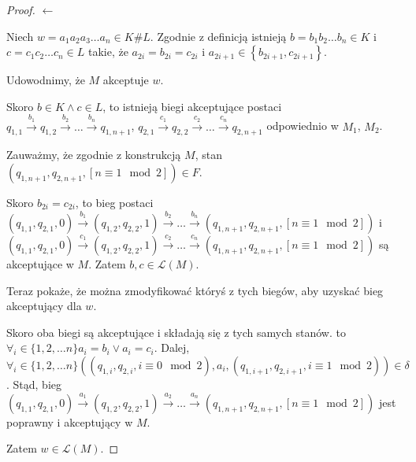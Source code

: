 \documentclass{article}
\theoremstyle{definition}
\theoremstyle{remark}
\begin{document}
\begin{proof}
    \(\leftarrow\)

    Niech \(w = a_1 a_2 a_3\ldots a_n \in K \# L\). Zgodnie z definicją istnieją \(b=b_1 b_2 \ldots b_n \in K\) i \(c=c_1 c_2 \ldots c_n \in L\) takie,
    że \(a_{2i} = b_{2i} = c_{2i}\) i \(a_{2i+1} \in \left\{ b_{2i+1}, c_{2i+1} \right\}\).

    Udowodnimy, że \(M\) akceptuje \(w\).

    Skoro \(b \in K \land c \in L\), to istnieją biegi akceptujące postaci \(q_{1,1} \xrightarrow{b_1} q_{1,2} \xrightarrow{b_2} \ldots \xrightarrow{b_n} q_{1,n+1}\),
    \(q_{2,1} \xrightarrow{c_1} q_{2,2} \xrightarrow{c_2} \ldots \xrightarrow{c_n} q_{2,n+1}\) odpowiednio w \(M_1\), \(M_2\).

    Zauważmy, że zgodnie z konstrukcją \(M\), stan \( \left( q_{1,n+1}, q_{2,n+1}, \left[ n \equiv 1 \mod 2 \right] \right) \in F\).
    
    Skoro \(b_{2i} = c_{2i}\), to bieg postaci
    \( \left(q_{1,1}, q_{2,1}, 0 \right) \xrightarrow{b_1} \left(q_{1,2}, q_{2,2}, 1 \right) \xrightarrow{b_2} \ldots \xrightarrow{b_n} \left(q_{1,n+1}, q_{2,n+1}, \left[ n \equiv 1 \mod 2  \right] \right) \)
    i
    \( \left(q_{1,1}, q_{2,1}, 0 \right) \xrightarrow{c_1} \left(q_{1,2}, q_{2,2}, 1 \right) \xrightarrow{c_2} \ldots \xrightarrow{c_n} \left(q_{1,n+1}, q_{2,n+1}, \left[ n \equiv 1 \mod 2  \right] \right) \)
    są akceptujące w \(M\). Zatem \(b, c \in \mathcal{L}(M)\).
    
    Teraz pokaże, że można zmodyfikować któryś z tych biegów, aby uzyskać bieg akceptujący dla \(w\).

    Skoro oba biegi są akceptujące i składają się z tych samych stanów. to \( \forall_i \in \{1,2,\ldots n\} a_i = b_i \lor a_i = c_i \).
    Dalej, \( \forall_i \in \{1,2,\ldots n\} \left( \left( q_{1,i}, q_{2,i}, i \equiv 0 \mod 2 \right), a_i, \left( q_{1,i+1}, q_{2,i+1}, i \equiv 1 \mod 2 \right)  \right) 
    \in \delta \). Stąd, bieg  \( \left(q_{1,1}, q_{2,1}, 0 \right) \xrightarrow{a_1} \left(q_{1,2}, q_{2,2}, 1 \right) \xrightarrow{a_2} \ldots \xrightarrow{a_n} \left(q_{1,n+1}, q_{2,n+1}, \left[ n \equiv 1 \mod 2  \right] \right) \)
    jest poprawny i akceptujący w \(M\).

    Zatem \(w \in \mathcal{L}(M)\).
\end{proof}

\section{}
\end{document}
